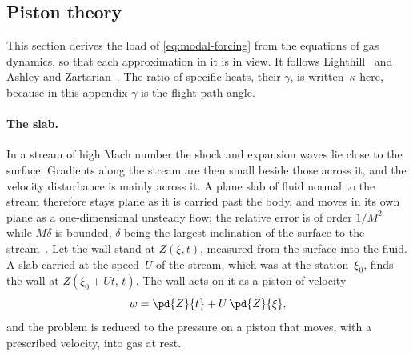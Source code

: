 \subsection{Piston theory}\label{sec:piston}

This section derives the load of \cref{eq:modal-forcing} from the equations
of gas dynamics, so that each approximation in it is in view. It follows
Lighthill~\cite{lighthill1953oscillating} and Ashley and
Zartarian~\cite{ashley1956piston}. The ratio of specific heats, their
$\gamma$, is written~$\kappa$ here, because in this appendix $\gamma$ is the
flight-path angle.

\paragraph{The slab.}
In a stream of high Mach number the shock and expansion waves lie close to
the surface. Gradients along the stream are then small beside those across
it, and the velocity disturbance is mainly across it. A plane slab of fluid
normal to the stream therefore stays plane as it is carried past the body,
and moves in its own plane as a one-dimensional unsteady flow; the relative
error is of order $1/M^2$ while $M\delta$ is bounded, $\delta$ being the
largest inclination of the surface to the
stream~\cite{lighthill1953oscillating}. Let the wall stand at $Z(\xi,t)$,
measured from the surface into the fluid. A slab carried at the speed~$U$ of
the stream, which was at the station~$\xi_0$, finds the wall at
$Z(\xi_0+Ut,\,t)$. The wall acts on it as a piston of velocity
\begin{equation}\label{eq:downwash}
  w = \pd{Z}{t} + U\,\pd{Z}{\xi} ,
\end{equation}
and the problem is reduced to the pressure on a piston that moves, with a
prescribed velocity, into gas at rest.

